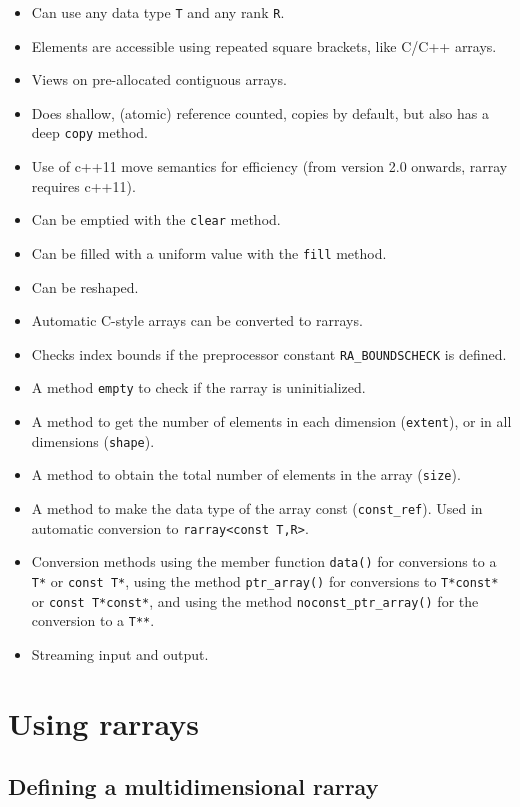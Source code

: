 \documentclass[11pt,twoside]{article}
\begin{document}
\begin{itemize}\itemsep0pt\parskip2pt
\item Can use any data type {\tt T} and any rank {\tt R}.
\item Elements are accessible using repeated square brackets, like C/C++ arrays.
\item Views on pre-allocated contiguous arrays.
\item Does shallow, (atomic) reference counted, copies by default, but also has a deep {\tt copy}
  method.
\item Use of c++11 move semantics for efficiency (from version 2.0
  onwards, rarray requires c++11).
\item Can be emptied with the {\tt clear} method.
\item Can be filled with a uniform value with the {\tt fill} method.
\item Can be reshaped.
\item Automatic C-style arrays can be converted to rarrays.
\item Checks index bounds if the preprocessor constant {\tt RA\_BOUNDSCHECK} is defined. 
\item A method {\tt empty} to check if the rarray is uninitialized.
\item A method to get the number of elements in each
  dimension (\texttt{extent}), or in all dimensions (\texttt{shape}).
\item A method to obtain the total number of elements in the
  array (\texttt{size}).
\item A method to make the data type of the array const
  (\texttt{const\_ref}).  Used in automatic conversion to \texttt{rarray<const T,R>}.
\item Conversion methods using the member
  function \texttt{data()} for conversions to a \texttt{T*} or
  \texttt{const T*}, using the method \texttt{ptr\_array()} for
  conversions to \texttt{T*const*} or \texttt{const T*const*}, and
  using the method \texttt{noconst\_ptr\_array()} for the conversion to a
  \texttt{T**}.
\item Streaming input and output.
\end{itemize}

\section{Using rarrays}

\subsection{Defining a multidimensional rarray}
\label{definerarray}
\end{document}
